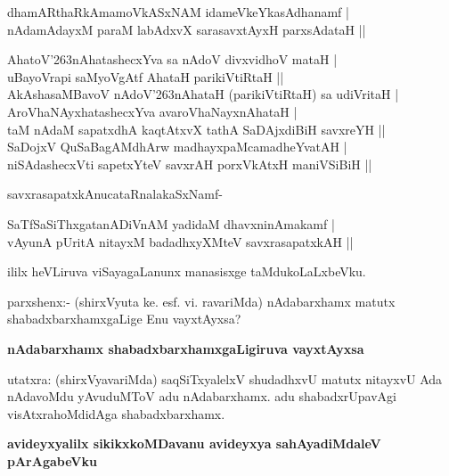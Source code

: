 \begin{shloka}
dhamARthaRkAmamoVkASxNAM idameVkeYkasAdhanamf |\\\label{159}
nAdamAdayxM paraM labAdxvX sarasavxtAyxH parxsAdataH ||
\end{shloka}

\begin{shloka}
AhatoV\char'263nAhatashecxYva sa nAdoV divxvidhoV mataH |\\\label{159}
uBayoVrapi saMyoVgAtf AhataH parikiVtiRtaH ||\\
AkAshasaMBavoV nAdoV\char'263nAhataH (parikiVtiRtaH) sa udiVritaH |\\
AroVhaNAyxhatashecxYva avaroVhaNayxnAhataH |\\
taM nAdaM sapatxdhA kaqtAtxvX tathA SaDAjxdiBiH savxreYH ||\\
SaDojxV QuSaBagAMdhArw madhayxpaMcamadheYvatAH |\\
niSAdashecxVti sapetxYteV savxrAH porxVkAtxH maniVSiBiH ||
\end{shloka}

\noindent
savxrasapatxkAnucataRnalakaSxNamf-\label{160}

\begin{shloka}
SaTfSaSiThxgatanADiVnAM yadidaM dhavxninAmakamf |\\
vAyunA pUritA nitayxM badadhxyXMteV savxrasapatxkAH ||
\end{shloka}

\noindent
ililx heVLiruva viSayagaLanunx manasisxge taMdukoLaLxbeVku.

parxshenx:- (shirxVyuta ke. esf. vi. ravariMda) nAdabarxhamx matutx shabadxbarxhamxgaLige Enu vayxtAyxsa?

{\bigskip
\noindent
{\large\bf nAdabarxhamx shabadxbarxhamxgaLigiruva vayxtAyxsa}}\label{160}
\medskip

\noindent
utatxra: (shirxVyavariMda) saqSiTxyalelxV shudadhxvU matutx nitayxvU Ada nAdavoMdu yAvuduMToV adu nAdabarxhamx. adu shabadxrUpavAgi visAtxrahoMdidAga shabadxbarxhamx.

{\bigskip
\noindent
{\large\bf avideyxyalilx sikikxkoMDavanu avideyxya sahAyadiMdaleV pArAgabeVku}}\label{page160}
\medskip

